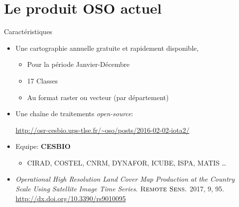 \documentclass[pressentation,10pt,aspectratio=1610, xcolor=table]{beamer}
\begin{document}
\section{Le produit OSO actuel}
\label{sec:orgf57d9c7}
\begin{frame}[label={sec:orgb359c5d}]{Caractéristiques}
\begin{itemize}
\item Une cartographie annuelle gratuite et rapidement disponible,
\begin{itemize}
\item Pour la période \og Janvier-Décembre\fg
\item 17 Classes
\item Au format raster ou vecteur (par département)
\end{itemize}
\item Une chaîne de traitements \emph{open-source}:
\begin{center}
\url{http://osr-cesbio.ups-tlse.fr/\~oso/posts/2016-02-02-iota2/} 
\end{center}
\item Equipe: \textbf{CESBIO}
\begin{itemize}
\item CIRAD, COSTEL, CNRM, DYNAFOR, ICUBE, ISPA, MATIS \ldots{}
\end{itemize}
\item \emph{Operational High Resolution Land Cover Map Production at the Country
Scale Using Satellite Image  Time Series}.  \(\textsc{Remote Sens.}\)
2017, 9, 95. \url{http://dx.doi.org/10.3390/rs9010095}
\end{itemize}
\end{frame}
\end{document}
